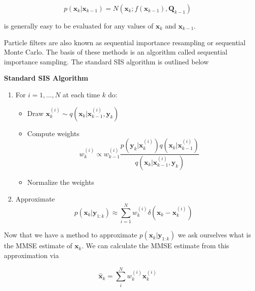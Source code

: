 \begin{equation}
p(\mathbf{x}_k | \mathbf{x}_{k-1}) = N(\mathbf{x}_k; f(\mathbf{x}_{k-1}), \mathbf{Q}_{k-1})
\end{equation}

is generally easy to be evaluated for any values of $ \mathbf{x}_k$ and $\mathbf{x}_{k-1}$.

Particle filters are also known as sequential importance resampling or sequential Monte Carlo.
The basis of these methods is an algorithm called  sequential importance sampling. The standard SIS algorithm
is outlined below 


\begin{framed}
\theoremstyle{remark}
\begin{remark}{\textbf{Standard SIS Algorithm}}

\begin{enumerate}
\item For $i=1,\ldots, N$ at each time $k$ do:
	\begin{itemize}
		\item Draw $\mathbf{x}_{k}^{(i)} \sim q(\mathbf{x}_k | \mathbf{x}_{k-1}^{(i)}, \mathbf{y}_k)$
		\item Compute weights
			\begin{equation}
				w_{k}^{(i)} \propto w_{k-1}^{(i)} \frac{p(\mathbf{y}_k | \mathbf{x}_{k}^{(i)})q(\mathbf{x}_k | \mathbf{x}_{k-1}^{(i)})}{q(\mathbf{x}_k | \mathbf{x}_{k-1}^{(i)}, \mathbf{y}_k)}
			\end{equation}
		\item Normalize the weights
	\end{itemize}
\item Approximate
\begin{equation}
p(\mathbf{x}_k | \mathbf{y}_{1:k}) \approx \sum_{i=1}^{N} w_{k}^{(i)} \delta(\mathbf{x}_k - \mathbf{x}_{k}^{(i)})
\end{equation}
\end{enumerate}

\end{remark}
\end{framed}

Now that we have a method to approximate $p(\mathbf{x}_k | \mathbf{y}_{1:k})$ we ask ourselves what is the MMSE estimate of $\mathbf{x}_k$.
We can  calculate the MMSE estimate from this approximation via

\begin{equation}
\hat{\mathbf{x}}_k = \sum_{i}^{N} w_{k}^{(i)} \mathbf{x}_{k}^{(i)}
\end{equation}

